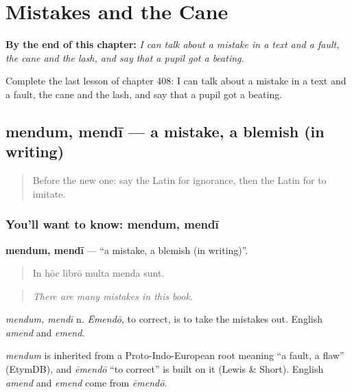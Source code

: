 
\chapter{Mistakes and the Cane}
\label{ch:la-mistakes-and-the-cane}

\begin{chapteropening}
\textbf{By the end of this chapter:} \emph{I can talk about a mistake in a text and a fault, the cane and the lash, and say that a pupil got a beating.}

Complete the last lesson of chapter 408: I can talk about a mistake in a text and a fault, the cane and the lash, and say that a pupil got a beating.
\end{chapteropening}

\section[mendum, mendī]{mendum, mendī — a mistake, a blemish (in writing)}

\label{lesson:LA-C408-mendum}



\begin{quote}
Before the new one: say the Latin for ignorance, then the Latin for to imitate.
\end{quote}

\subsection*{You'll want to know: mendum, mendī}
\textbf{mendum, mendī} — \textquotedblleft{}a mistake, a blemish (in writing)\textquotedblright{}.

\begin{quote}
In hōc librō multa menda sunt.
\end{quote}

\begin{quote}
\emph{There are many mistakes in this book.}
\end{quote}

\emph{mendum, mendī} n. \emph{Ēmendō}, to correct, is to take the mistakes out. English \emph{amend} and \emph{emend}.

\begin{cousinweb}
\emph{mendum} is inherited from a Proto-Indo-European root meaning \textquotedblleft{}a fault, a flaw\textquotedblright{} (EtymDB), and \emph{ēmendō} \textquotedblleft{}to correct\textquotedblright{} is built on it (Lewis \& Short). English \emph{amend} and \emph{emend} come from \emph{ēmendō}.
\end{cousinweb}

